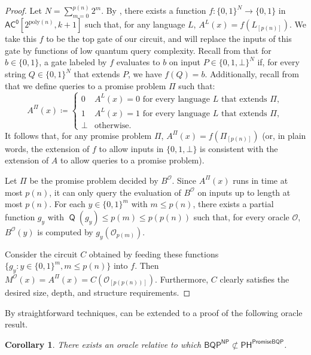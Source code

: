 \documentclass[10pt,a4paper]{article}
\newtheorem{corollary}[theorem]{Corollary}
\newcommand{\poly}{\mathrm{poly}}
\DeclareMathOperator{\Q}{\mathsf{Q}}
\begin{document}
\begin{proof}
Let $N = \sum_{m=0}^{p(n)} 2^{m}$. By , there exists a function $f: \{0,1\}^N \to \{0,1\}$ in $\mathsf{AC^0}\left[2^{\poly(n)}, k+1\right]$ such that, for any language $L$, $A^{L}(x) = f\left(L_{[p(n)]}\right)$. We take this $f$ to be the top gate of our circuit, and will replace the inputs of this gate by functions of low quantum query complexity. Recall from  that for $b \in \{0,1\}$, a gate labeled by $f$ evaluates to $b$ on input $P \in \{0,1,\bot\}^N$ if, for every string $Q \in \{0,1\}^N$ that extends $P$, we have $f(Q) = b$. Additionally, recall from  that we define queries to a promise problem $\Pi$ such that:
\[
A^\Pi(x) \coloneqq \begin{cases}
0 & A^L(x) = 0 \text{ for every language } L \text{ that extends } \Pi,\\
1 & A^L(x) = 1 \text{ for every language } L \text{ that extends } \Pi,\\
\bot & \text{otherwise}.
\end{cases}
\]
It follows that, for any promise problem $\Pi$, $A^{\Pi}(x) = f\left(\Pi_{[p(n)]}\right)$ (or, in plain words, the extension of $f$ to allow inputs in $\{0,1,\bot\}$ is consistent with the extension of $A$ to allow queries to a promise problem).

Let $\Pi$ be the promise problem decided by $B^\mathcal{O}$. Since $A^\Pi(x)$ runs in time at most $p(n)$, it can only query the evaluation of $B^\mathcal{O}$ on inputs up to length at most $p(n)$. For each $y \in \{0,1\}^{m}$ with $m \le p(n)$, there exists a partial function $g_y$ with $\Q(g_y) \le p(m) \le p(p(n))$ such that, for every oracle $\mathcal{O}$, $B^\mathcal{O}(y)$ is computed by $g_y\left(\mathcal{O}_{p(m)} \right)$.

Consider the circuit $C$ obtained by feeding these functions $\{g_y : y \in \{0,1\}^{m}, m \le p(n)\}$ into $f$. Then $M^\mathcal{O}(x) = A^{\Pi}(x) = C\left(\mathcal{O}_{[p(p(n))]}\right)$. Furthermore, $C$ clearly satisfies the desired size, depth, and structure requirements.
\end{proof}

By straightforward techniques,  can be extended to a proof of the following oracle result.


\begin{corollary}
\label{cor:bqp^np_not_in_ph^bqp}
There exists an oracle relative to which $\mathsf{BQP}^\mathsf{NP} \not\subset \mathsf{PH}^\mathsf{PromiseBQP}$.
\end{corollary}
\end{document}
